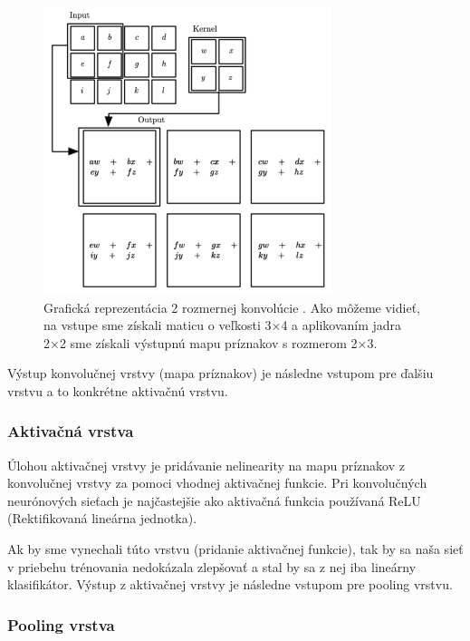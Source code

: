 \begin{figure}[H]
\centerline{\includegraphics[width=0.75\textwidth]{images/konvolucia.png}}
\caption{Grafická reprezentácia 2 rozmernej konvolúcie \cite{convnn}. Ako môžeme vidieť, na vstupe
sme získali maticu o veľkosti 3×4 a aplikovaním jadra 2×2 sme získali výstupnú mapu
príznakov s rozmerom 2×3.}
\label{fig:2d_konvolucia}
\end{figure}

Výstup konvolučnej vrstvy (mapa príznakov) je následne vstupom pre ďalšiu vrstvu a
to konkrétne aktivačnú vrstvu.

\subsubsection{Aktivačná vrstva}

Úlohou aktivačnej vrstvy je pridávanie nelinearity na mapu príznakov
z konvolučnej vrstvy za pomoci vhodnej aktivačnej funkcie. Pri konvolučných neurónových sieťach je najčastejšie ako aktivačná funkcia používaná ReLU (Rektifikovaná lineárna jednotka).

Ak by sme vynechali túto vrstvu (pridanie aktivačnej funkcie), tak by sa naša sieť
v priebehu trénovania nedokázala zlepšovať a stal by sa z nej iba lineárny klasifikátor.
Výstup z aktivačnej vrstvy je následne vstupom pre pooling vrstvu.

\subsubsection{Pooling vrstva}

